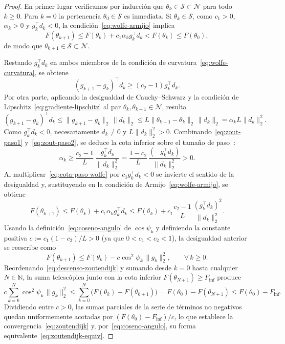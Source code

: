 \documentclass[a4paper,openany,oneside,10pt]{report}
\theoremstyle{pnlTeorema}
\theoremstyle{pnlDefinicion}
\theoremstyle{pnlObservacion}
\begin{document}
\begin{proof}
En primer lugar verificamos por inducción que $\theta_k\in\mathcal{S}\subset\mathcal{N}$
para todo $k\ge 0$. Para $k=0$ la pertenencia $\theta_0\in\mathcal{S}$ es
inmediata. Si $\theta_k\in\mathcal{S}$, como $c_1>0$, $\alpha_k>0$ y
$g_k^\top d_k<0$, la condición~\eqref{eq:wolfe-armijo} implica
\[
F(\theta_{k+1}) \le F(\theta_k)+c_1\alpha_k g_k^\top d_k < F(\theta_k) \le F(\theta_0),
\]
de modo que $\theta_{k+1}\in\mathcal{S}\subset\mathcal{N}$.

Restando $g_k^\top d_k$ en ambos miembros de la condición de
curvatura~\eqref{eq:wolfe-curvatura}, se obtiene
\begin{equation}\label{eq:zout-paso1}
(g_{k+1}-g_k)^\top d_k \ge (c_2-1)g_k^\top d_k.
\end{equation}
Por otra parte, aplicando la desigualdad de Cauchy--Schwarz y la condición de
Lipschitz~\eqref{eq:gradiente-lipschitz} al par $\theta_k,\theta_{k+1}\in\mathcal{N}$,
resulta
\begin{equation}\label{eq:zout-paso2}
(g_{k+1}-g_k)^\top d_k
\le \|g_{k+1}-g_k\|_2\,\|d_k\|_2
\le L\|\theta_{k+1}-\theta_k\|_2\,\|d_k\|_2
= \alpha_k L\|d_k\|_2^2.
\end{equation}
Como $g_k^\top d_k<0$, necesariamente $d_k\neq 0$ y $L\|d_k\|_2^2>0$.
Combinando~\eqref{eq:zout-paso1} y~\eqref{eq:zout-paso2}, se deduce la cota
inferior sobre el tamaño de paso~\cite[ec.~(3.31), p.~98]{andrei2020}:
\begin{equation}\label{eq:cota-paso-wolfe}
\alpha_k \ge \frac{c_2-1}{L}\,\frac{g_k^\top d_k}{\|d_k\|_2^2}
= \frac{1-c_2}{L}\,\frac{(-g_k^\top d_k)}{\|d_k\|_2^2} > 0.
\end{equation}
Al multiplicar~\eqref{eq:cota-paso-wolfe} por $c_1 g_k^\top d_k<0$ se invierte
el sentido de la desigualdad y, sustituyendo en la condición de
Armijo~\eqref{eq:wolfe-armijo}, se obtiene
\[
F(\theta_{k+1})
\le F(\theta_k) + c_1\alpha_k g_k^\top d_k
\le F(\theta_k) + c_1\frac{c_2-1}{L}\,\frac{(g_k^\top d_k)^2}{\|d_k\|_2^2}.
\]
Usando la definición~\eqref{eq:coseno-angulo} de $\cos\psi_k$ y definiendo la
constante positiva $c:=c_1(1-c_2)/L>0$ (ya que $0<c_1<c_2<1$), la desigualdad
anterior se reescribe como
\begin{equation}\label{eq:descenso-zoutendijk}
F(\theta_{k+1}) \le F(\theta_k) - c\cos^2\psi_k\,\|g_k\|_2^2,
\qquad \forall\,k\ge 0.
\end{equation}
Reordenando~\eqref{eq:descenso-zoutendijk} y sumando desde $k=0$ hasta cualquier
$N\in\mathbb{N}$, la suma telescópica junto con la cota inferior $F(\theta_{N+1})\ge F_{\inf}$
produce
\[
c\sum_{k=0}^{N}\cos^2\psi_k\,\|g_k\|_2^2
\le \sum_{k=0}^{N}\bigl(F(\theta_k)-F(\theta_{k+1})\bigr)
= F(\theta_0)-F(\theta_{N+1})
\le F(\theta_0)-F_{\inf}.
\]
Dividiendo entre $c>0$, las sumas parciales de la serie de términos no negativos
quedan uniformemente acotadas por $(F(\theta_0)-F_{\inf})/c$, lo que establece
la convergencia~\eqref{eq:zoutendijk} y, por~\eqref{eq:coseno-angulo}, su forma
equivalente~\eqref{eq:zoutendijk-equiv}.
\end{proof}
\end{document}
